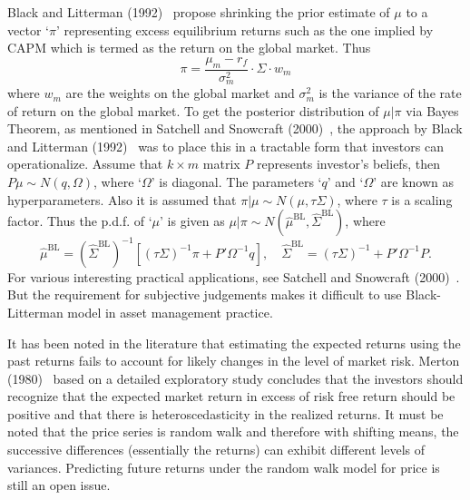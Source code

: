 Black and Litterman (1992)~\cite{blacklit} propose shrinking the prior estimate of $\mu$ to a vector `$\pi$' representing excess equilibrium returns such as the one implied by CAPM which is termed as the return on the global market. Thus
	\begin{equation}\label{eqn:bigpi}
	\pi = \dfrac{\mu_m-r_f}{\sigma_m^2} \cdot \Sigma \cdot w_m
	\end{equation}
where $w_m$ are the weights on the global market and $\sigma_m^2$ is the variance of the rate of return on the global market. To get the posterior distribution of $\mu \big| \pi$ via Bayes Theorem, as mentioned in Satchell and Snowcraft (2000)~\cite{snow}, the approach by Black and Litterman (1992)~\cite{blacklit}  was to place this in a tractable form that investors can operationalize. Assume that $k \times m$ matrix $P$ represents investor's beliefs, then $P \mu \sim N(q,\Omega)$, where `$\Omega$' is diagonal. The parameters `$q$' and `$\Omega$' are known as hyperparameters. Also it is assumed that $\pi \big| \mu \sim N(\mu,\tau \Sigma)$, where $\tau$ is a scaling factor. Thus the p.d.f. of `$\mu$' is given as $\mu \big| \pi \sim N(\hat{\mu}^{\text{BL}}, \hat{\Sigma}^{\text{BL}})$, where 
	\begin{equation} \label{eqn:bleq}
	\hat{\mu}^{\text{BL}}= (\hat{\Sigma}^{\text{BL}})^{-1} [ (\tau \Sigma)^{-1}\pi + P' \Omega^{-1}q], \quad \hat{\Sigma}^{\text{BL}}= (\tau \Sigma)^{-1} + P' \Omega^{-1}P.
	\end{equation}
For various interesting practical applications, see Satchell and Snowcraft (2000)~\cite{snow}. But the requirement for subjective judgements makes it difficult to use Black-Litterman model in asset management practice. 


It has been noted in the literature that estimating the expected returns using the past returns fails to account for likely changes in the level of market risk. Merton (1980)~\cite{merton} based on a detailed exploratory study concludes that the investors should recognize that the expected market return in excess of risk free return should be positive and that there is heteroscedasticity in the realized returns. It must be noted that the price series is random walk and therefore with shifting means, the successive differences (essentially the returns) can exhibit different levels of variances. Predicting future returns under the random walk model for price is still an open issue.


